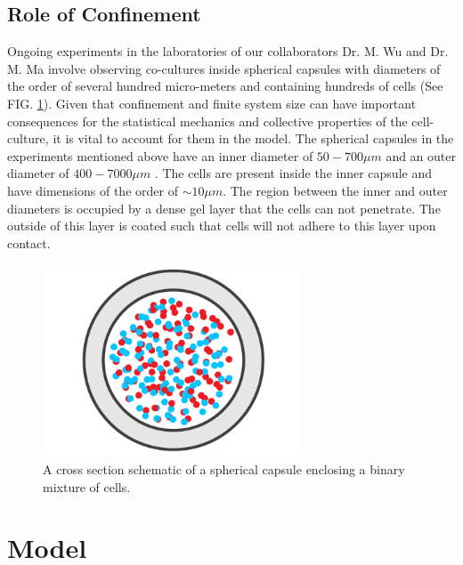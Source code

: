 \documentclass[aps,prb,twocolumn,groupedaddress,nofootinbib,floatfix]{revtex4}
\begin{document}
\subsection{Role of Confinement}

Ongoing experiments in the laboratories of our collaborators Dr. M. Wu and Dr. M. Ma involve observing co-cultures inside spherical capsules with diameters of the order of several hundred micro-meters 
and containing hundreds of cells\cite{Alessandri} (See FIG. \ref{fig:capsule}). Given that confinement and finite system size can have important consequences for the statistical mechanics and collective 
properties of the cell-culture, it is vital to account for them in the model. The spherical capsules in the experiments mentioned above have an inner diameter of $50-700\mu m$ and an outer diameter of $400-7000\mu m$ \cite{Mingming}.
The cells are present inside the inner capsule and have dimensions of the order of $\sim 10\mu m$.
The region between the inner and outer diameters is occupied by a dense gel layer that the cells can not penetrate.
The outside of this layer is coated such that cells will not adhere to this layer upon contact. \\

\begin{figure}
  \includegraphics[width=3in]{images/Fig1.png}
  \caption[capsule]
   {A cross section schematic of a spherical capsule enclosing a binary mixture of 
   cells.}
   \label{fig:capsule}
\end{figure}


\section{Model}
\end{document}
